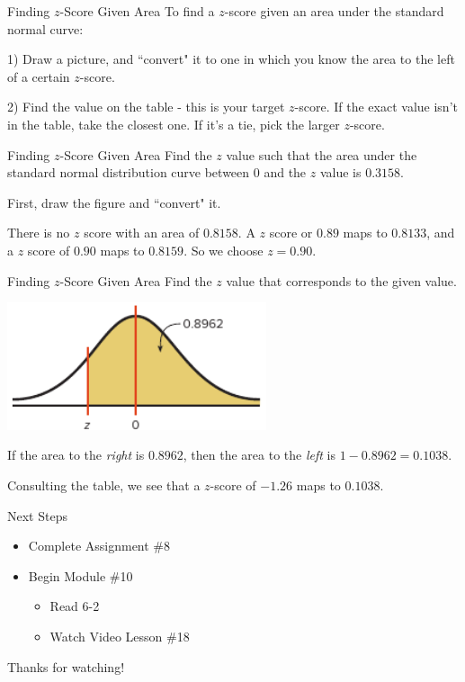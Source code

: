 \documentclass[t, aspectratio=169]{beamer}
\newcommand{\?}{\stackrel{?}{=}}
\begin{document}
	\begin{frame}{Finding $z$-Score Given Area}
		To find a $z$-score given an area under the standard normal curve: \pause
		
		1) Draw a picture, and ``convert" it to one in which you know the area to the left of a certain $z$-score. \pause
		
		2) Find the value on the table - this is your target $z$-score. If the exact value isn't in the table, take the closest one. If it's a tie, pick the larger $z$-score.
	\end{frame}

	\begin{frame}{Finding $z$-Score Given Area}
		Find the $z$ value such that the area under the standard normal distribution curve between $0$ and the $z$ value is $0.3158$. \pause
		
		First, draw the figure and ``convert" it. \pause \vspace{1.5in}
		
		There is no $z$ score with an area of $0.8158$. A $z$ score or $0.89$ maps to $0.8133$, and a $z$ score of $0.90$ maps to $0.8159$. So we choose $z = 0.90$.
	\end{frame}

	\begin{frame}{Finding $z$-Score Given Area}
		Find the $z$ value that corresponds to the given value.
		
		\includegraphics[width=3in]{find-z.png} \pause
		
		If the area to the \textit{right} is $0.8962$, then the area to the \textit{left} is $1 - 0.8962 = 0.1038$. \pause
		
		Consulting the table, we see that a $z$-score of $-1.26$ maps to $0.1038$.
	\end{frame}

	\begin{frame}{Next Steps}
		\begin{itemize}
			\item Complete Assignment \#8
			\item Begin Module \#10 \begin{itemize}
				\item Read 6-2
				\item Watch Video Lesson \#18
			\end{itemize}
		\end{itemize} \vfill
	
		Thanks for watching!
	\end{frame}
	
\end{document}
